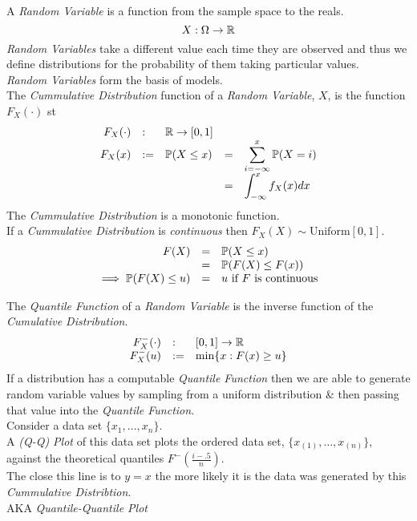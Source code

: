 \documentclass[11pt,a4paper]{article}
\begin{document}
A \textit{Random Variable} is a function from the sample space to the reals.
$$X:\Omega\to\mathbb{R}$$
\textit{Random Variables} take a different value each time they are observed and thus we define distributions for the probability of them taking particular values.\\
\textit{Random Variables} form the basis of models.\\

The \textit{Cummulative Distribution} function of a \textit{Random Variable}, $X$, is the function $F_X(\cdot)$ st
\[\begin{array}{rllrl}
F_X(\cdot)&:&\mathbb{R}\to[0,1]\\
F_X(x)&:=&\mathbb{P}(X\leq x)&=&\displaystyle\sum_{i=-\infty}^x\mathbb{P}(X=i)\\
&&&=&\displaystyle\int_{-\infty}^xf_X(x)dx
\end{array}\]
The \textit{Cummulative Distribution} is a monotonic function.\\

If a \textit{Cummulative Distribution} is \textit{continuous} then $F_X(X)\sim\text{Uniform}[0,1]$.\\

\[\begin{array}{rcl}
F(X)&=&\mathbb{P}(X\leq x)\\
&=&\mathbb{P}(F(X)\leq F(x))\\
\implies\mathbb{P}(F(X)\leq u)&=&u\text{ if $F$ is continuous}
\end{array}\]

The \textit{Quantile Function} of a \textit{Random Variable} is the inverse function of the \textit{Cumulative Distribution}.\\
\[\begin{array}{rll}
F^-_X(\cdot)&:&[0,1]\to\mathbb{R}\\
F^-_X(u)&:=&\min\{x:F(x)\geq u\}
\end{array}\]
If a distribution has a computable \textit{Quantile Function} then we are able to generate random variable values by sampling from a uniform distribution \& then passing that value into the \textit{Quantile Function}.\\

Consider a data set $\{x_1,\dots,x_n\}$.\\
A \textit{(Q-Q) Plot} of this data set plots the ordered data set, $\{x_{(1)},\dots,x_{(n)}\}$, against the theoretical quantiles $F^-\left(\frac{i-.5}n\right)$.\\
The close this line is to $y=x$ the more likely it is the data was generated by this \textit{Cummulative Distribtion}.\\
\nb AKA \textit{Quantile-Quantile Plot}
\end{document}
